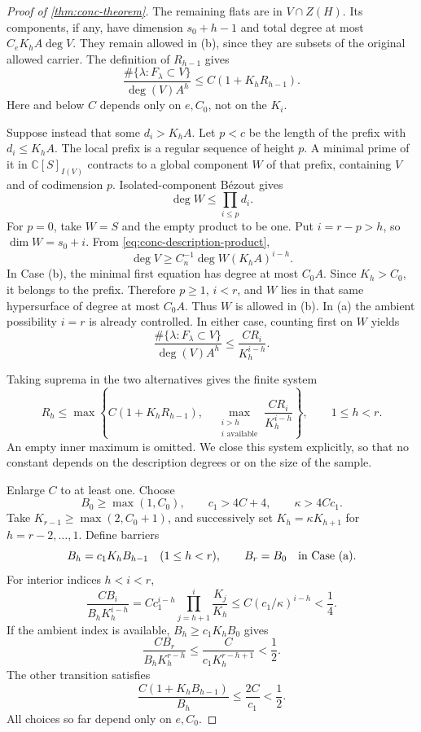 \begin{proof}[Proof of \cref{thm:conc-theorem}]
The remaining flats are in $V\cap Z(H)$.  Its components, if any, have dimension $s_0+h-1$ and total degree at most $C_eK_hA\deg V$.  They remain allowed in (b), since they are subsets of the original allowed carrier.  The definition of $R_{h-1}$ gives
\begin{equation}
 \frac{\#\{\lambda:F_\lambda\subset V\}}{\deg(V)A^h}
 \leq C(1+K_hR_{h-1}).
 \label{eq:conc-low-recurrence}
\end{equation}
Here and below $C$ depends only on $e,C_0$, not on the $K_i$.

Suppose instead that some $d_i>K_hA$.  Let $p<c$ be the length of the prefix with $d_i\leq K_hA$.  The local prefix is a regular sequence of height $p$.  A minimal prime of it in $\mathbb{C}[S]_{I(V)}$ contracts to a global component $W$ of that prefix, containing $V$ and of codimension $p$.  Isolated-component B\'ezout gives
\[
 \deg W\leq\prod_{i\leq p}d_i.
\]
For $p=0$, take $W=S$ and the empty product to be one.  Put $i=r-p>h$, so $\dim W=s_0+i$.  From \eqref{eq:conc-description-product},
\begin{equation}
 \deg V\geq C_n^{-1}\deg W(K_hA)^{i-h}.
 \label{eq:conc-degree-comparison}
\end{equation}
In Case (b), the minimal first equation has degree at most $C_0A$. Since $K_h>C_0$, it belongs to the prefix.  Therefore $p\geq1$, $i<r$, and $W$ lies in that same hypersurface of degree at most $C_0A$.  Thus $W$ is allowed in (b).  In (a) the ambient possibility $i=r$ is already controlled.  In either case, counting first on $W$ yields
\begin{equation}
 \frac{\#\{\lambda:F_\lambda\subset V\}}{\deg(V)A^h}
 \leq \frac{C R_i}{K_h^{i-h}}.
 \label{eq:conc-high-recurrence}
\end{equation}

Taking suprema in the two alternatives gives the finite system
\begin{equation}
 R_h\leq\max\left\{
 C(1+K_hR_{h-1}),\quad
 \max_{\substack{i>h\\i\text{ available}}}
       \frac{CR_i}{K_h^{i-h}}\right\},
 \qquad1\leq h<r.
 \label{eq:conc-recurrence-system}
\end{equation}
An empty inner maximum is omitted.  We close this system explicitly, so that no constant depends on the description degrees or on the size of the sample.

Enlarge $C$ to at least one.  Choose
\[
 B_0\geq\max(1,C_0),\qquad c_1>4C+4,\qquad \kappa>4Cc_1.
\]
Take $K_{r-1}\geq\max(2,C_0+1)$, and successively set $K_h=\kappa K_{h+1}$ for $h=r-2,\ldots,1$.  Define barriers
\[
 B_h=c_1K_hB_{h-1}\quad(1\leq h<r),
 \qquad B_r=B_0\quad\hbox{in Case (a)}.
\]
For interior indices $h<i<r$,
\[
 \frac{CB_i}{B_hK_h^{i-h}}
 =C c_1^{i-h}\prod_{j=h+1}^{i}\frac{K_j}{K_h}
 \leq C(c_1/\kappa)^{i-h}<\frac14.
\]
If the ambient index is available, $B_h\geq c_1K_hB_0$ gives
\[
 \frac{CB_r}{B_hK_h^{r-h}}
 \leq\frac{C}{c_1K_h^{r-h+1}}<\frac12.
\]
The other transition satisfies
\[
 \frac{C(1+K_hB_{h-1})}{B_h}\leq\frac{2C}{c_1}<\frac12.
\]
All choices so far depend only on $e,C_0$.


\end{proof}
